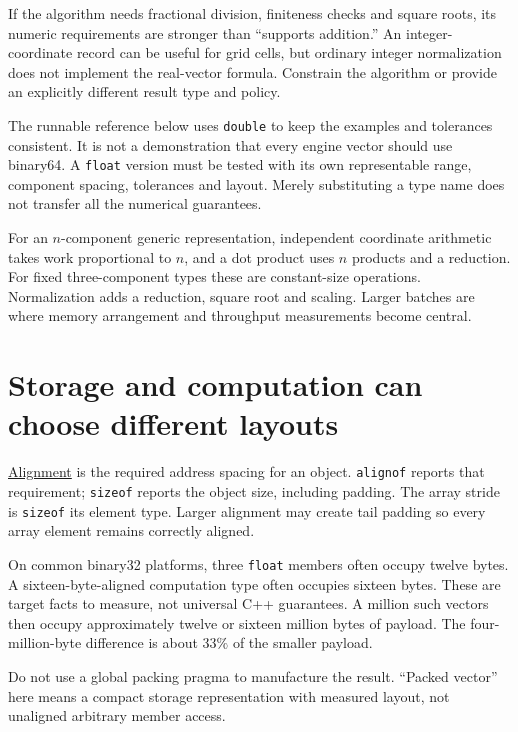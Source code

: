 If the algorithm needs fractional division, finiteness checks and square roots, its numeric requirements are stronger than ``supports addition.'' An integer-coordinate record can be useful for grid cells, but ordinary integer normalization does not implement the real-vector formula. Constrain the algorithm or provide an explicitly different result type and policy.

The runnable reference below uses \texttt{double} to keep the examples and tolerances consistent. It is not a demonstration that every engine vector should use binary64. A \texttt{float} version must be tested with its own representable range, component spacing, tolerances and layout. Merely substituting a type name does not transfer all the numerical guarantees.

For an \(n\)-component generic representation, independent coordinate arithmetic takes work proportional to \(n\), and a dot product uses \(n\) products and a reduction. For fixed three-component types these are constant-size operations. Normalization adds a reduction, square root and scaling. Larger batches are where memory arrangement and throughput measurements become central.

\section{Storage and computation can choose different layouts}\label{02-foundations-ii-ch037-storage-and-computation-can-choose-different-layouts}

\hyperref[02-foundations-ii-ch037-storage-and-computation-can-choose-different-layouts]{Alignment} is the required address spacing for an object. \texttt{alignof} reports that requirement; \texttt{sizeof} reports the object size, including padding. The array stride is \texttt{sizeof} its element type. Larger alignment may create tail padding so every array element remains correctly aligned.

On common binary32 platforms, three \texttt{float} members often occupy twelve bytes. A sixteen-byte-aligned computation type often occupies sixteen bytes. These are target facts to measure, not universal C++ guarantees. A million such vectors then occupy approximately twelve or sixteen million bytes of payload. The four-million-byte difference is about \(33\%\) of the smaller payload.

Do not use a global packing pragma to manufacture the result. ``Packed vector'' here means a compact storage representation with measured layout, not unaligned arbitrary member access.

